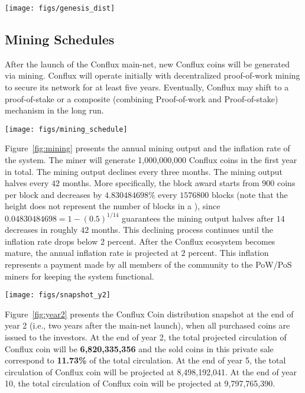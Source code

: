 \begin{figure*}
	\centering
	\texttt{[image: figs/genesis\_dist]}
	\caption{Genesis Distribution}
	\label{fig:genesis}
\end{figure*}

\subsection{Mining Schedules}
\label{sec:mining schedule}
After the launch of the Conflux main-net, new Conflux coins will be generated via mining. Conflux will operate initially with decentralized proof-of-work mining to secure its network for at least five years. Eventually, Conflux may shift to a proof-of-stake or a composite (combining Proof-of-work and Proof-of-stake) mechanism in the long run.

\begin{figure*}[h]
	\centering
	\texttt{[image: figs/mining\_schedule]}
	\caption{Mining Releases \& Inflation}
	\label{fig:mining}
\end{figure*}

Figure~\ref{fig:mining} presents the annual mining output and the inflation rate of the system. The miner will generate 1,000,000,000 Conflux coins in the first year in total. The mining output declines every three months. The mining output halves every $42$ months. 
More specifically, the block award starts from $900$ coins per block and decreases by $4.830484698\%$ every $1576800
$ blocks (note that the height does not represent the number of blocks in a \tg), since $0.04830484698=1-(0.5)^{1/14}$ guarantees the mining output halves after $14$ decreases in roughly $42$ months.
This declining process continues until the inflation rate drops below 2 percent. After the Conflux ecosystem becomes mature, the annual inflation rate is projected at $2$ percent. This inflation represents a payment made by all members of the community to the PoW/PoS miners for keeping the system functional.

\begin{figure*}[h]
	\centering
	\texttt{[image: figs/snapshot\_y2]}
	\caption{Snapshot at the End of Year 2}
	\label{fig:year2}
\end{figure*}
Figure~\ref{fig:year2} presents the Conflux Coin distribution snapshot at the end of year 2 (i.e., two years after the main-net launch), when all purchased coins are issued to the investors. At the end of year 2, the total projected circulation of Conflux coin will be {\bf 6,820,335,356} and the sold coins in this private sale correspond to {\bf 11.73\%} of the total circulation. At the end of year 5, the total circulation of Conflux coin will be projected at 8,498,192,041. At the end of year 10, the total circulation of Conflux coin will be projected at 9,797,765,390.


